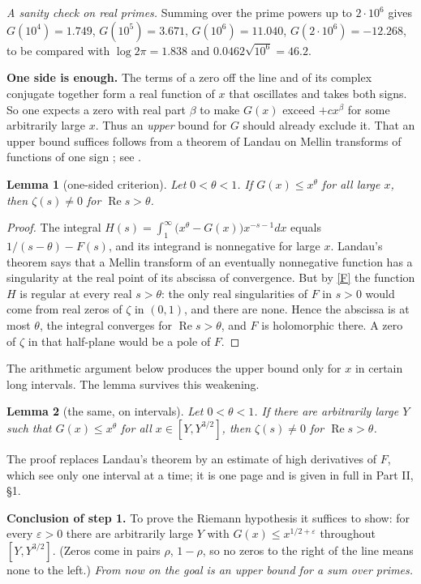 \documentclass[11pt,letterpaper]{article}
\newtheorem*{lemma}{Lemma}
\newcommand{\re}{\operatorname{Re}}
\begin{document}
\emph{A sanity check on real primes.} Summing over the prime powers up to $2\cdot10^6$ gives
$G(10^4)=1.749$, $G(10^5)=3.671$, $G(10^6)=11.040$, $G(2\cdot10^6)=-12.268$, to be compared with
$\log2\pi=1.838$ and $0.0462\sqrt{10^6}=46.2$.

\textbf{One side is enough.} The terms of a zero off the line and of its complex conjugate together form a real function of $x$ that
oscillates and takes both signs. So one expects a zero with real part $\beta$ to make $G(x)$
exceed $+cx^{\beta}$ for some arbitrarily large $x$. Thus an \emph{upper} bound for $G$ should already
exclude it. That an upper bound suffices follows from a theorem of Landau on Mellin transforms of functions of one sign \cite{Lan05}; see \cite[\S15.1]{MV07}.

\begin{lemma}[one-sided criterion] Let $0<\theta<1$. If $G(x)\le x^\theta$ for all large $x$, then
$\zeta(s)\ne0$ for $\re s>\theta$.
\end{lemma}
\begin{proof} The integral $H(s)=\int_1^\infty\big(x^\theta-G(x)\big)x^{-s-1}dx$ equals $1/(s-\theta)-F(s)$,
and its integrand is nonnegative for large $x$. Landau's theorem says that a Mellin transform of an
eventually nonnegative function has a singularity at the real point of its abscissa of convergence. But by
\eqref{F} the function $H$ is regular at every real $s>\theta$: the only real singularities of $F$ in
$s>0$ would come from real zeros of $\zeta$ in $(0,1)$, and there are none. Hence the abscissa is at most
$\theta$, the integral converges for $\re s>\theta$, and $F$ is holomorphic there. A zero of $\zeta$ in that
half-plane would be a pole of $F$.
\end{proof}

The arithmetic argument below produces the upper bound only for $x$ in certain long intervals. The lemma
survives this weakening.

\begin{lemma}[the same, on intervals] Let $0<\theta<1$. If there are arbitrarily large $Y$ such that
$G(x)\le x^\theta$ for all $x\in[Y,Y^{3/2}]$, then $\zeta(s)\ne0$ for $\re s>\theta$.
\end{lemma}

\noindent The proof replaces Landau's theorem by an estimate of high derivatives of $F$, which see only one
interval at a time; it is one page and is given in full in Part II, \S1.

\textbf{Conclusion of step 1.} To prove the Riemann hypothesis it suffices to show: for every
$\varepsilon>0$ there are arbitrarily large $Y$ with $G(x)\le x^{1/2+\varepsilon}$ throughout
$[Y,Y^{3/2}]$. (Zeros come in pairs $\rho$, $1-\rho$, so no zeros to the right of the line means none to the
left.) \emph{From now on the goal is an upper bound for a sum over primes.}
\end{document}

